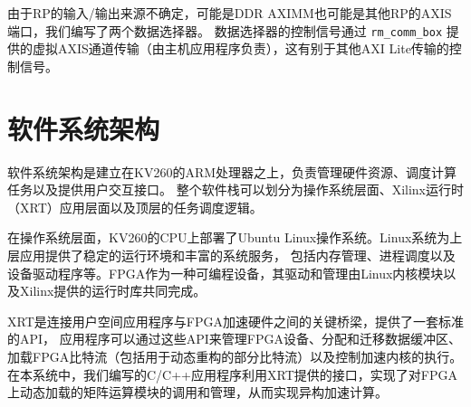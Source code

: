 由于RP的输入/输出来源不确定，可能是DDR AXIMM也可能是其他RP的AXIS端口，我们编写了两个数据选择器。
数据选择器的控制信号通过 \verb|rm_comm_box| 提供的虚拟AXIS通道传输（由主机应用程序负责），这有别于其他AXI Lite传输的控制信号。

\section{软件系统架构}

软件系统架构是建立在KV260的ARM处理器之上，负责管理硬件资源、调度计算任务以及提供用户交互接口。
整个软件栈可以划分为操作系统层面、Xilinx运行时（XRT）应用层面以及顶层的任务调度逻辑。

在操作系统层面，KV260的CPU上部署了Ubuntu Linux操作系统。Linux系统为上层应用提供了稳定的运行环境和丰富的系统服务，
包括内存管理、进程调度以及设备驱动程序等。FPGA作为一种可编程设备，其驱动和管理由Linux内核模块以及Xilinx提供的运行时库共同完成。

XRT是连接用户空间应用程序与FPGA加速硬件之间的关键桥梁，提供了一套标准的API，
应用程序可以通过这些API来管理FPGA设备、分配和迁移数据缓冲区、加载FPGA比特流（包括用于动态重构的部分比特流）以及控制加速内核的执行。
在本系统中，我们编写的C/C++应用程序利用XRT提供的接口，实现了对FPGA上动态加载的矩阵运算模块的调用和管理，从而实现异构加速计算。
